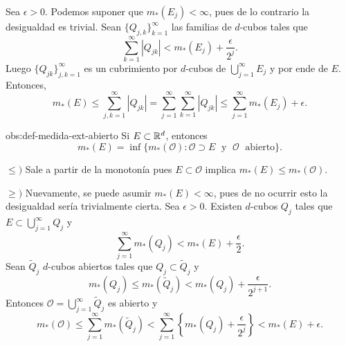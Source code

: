     \begin{demo}   Sea $\epsilon>0$.  Podemos suponer que $m_{*}(E_j)<\infty$, pues de lo contrario la desigualdad es trivial.
   Sean  $\{Q_{j,k}\}_{k=1}^{\infty}$ las familias de $d$-cubos tales que 
    \[
    \sum\limits_{k=1}^{\infty} |Q_{jk}|<m_{*}(E_j)+\frac{\epsilon}{2^j}.
    \]
    Luego $\{Q_{jk}\}_{j, k=1}^{\infty}$ es un cubrimiento por $d$-cubos de $\bigcup\limits_{j=1}^{\infty} E_j$
    y por ende de $E$. 
    Entonces,     
    \[
    m_{*}(E)\leq \sum\limits_{j,k=1}^{\infty} |Q_{jk}|=
    \sum\limits_{j=1}^{\infty} \sum\limits_{k=1}^{\infty} |Q_{jk}|
    \leq \sum\limits_{j=1}^{\infty} m_{*}(E_j)+\epsilon.
    \]


    \end{demo}
    



    \begin{proposicion}{obs:def-medida-ext-abierto}
    Si $E\subset \mathbb{R}^d$, entonces
    \[
    m_{*}(E)=
    \inf\{
    m_{*}(\mathcal{O}): \mathcal{O}\supset E\;\mbox{ y }\;\mathcal{O}\;\mbox{ abierto} 
    \}.
    \]
    \end{proposicion}
    \begin{demo}
    $\leq)$
    Sale a partir de la monoton\'ia pues $E \subset \mathscr{O}$ implica $m_{*}(E)\leq m_{*}(\mathscr{O})$.
    
    \noindent $\geq)$ Nuevamente, se puede asumir $m_*(E)<\infty$, pues de no ocurrir esto la desigualdad sería trivialmente cierta.
    Sea $\epsilon>0$. Existen $d$-cubos  $Q_j$  tales que $E\subset \bigcup\limits_{j=1}^{\infty}Q_j$ y
    \[
    \sum\limits_{j=1}^{\infty} m_{*}(Q_j)< m_{*}(E)+\frac{\epsilon}{2}.
    \]
    Sean $\widetilde{Q}_j$  $d$-cubos abiertos tales que $Q_j \subset \widetilde{Q}_j$ y 
    \[
    m_{*}(Q_j)\leq m_{*}(\widetilde{Q}_j)<m_{*}(Q_j)+\frac{\epsilon}{ 2^{j+1}}.
    \]
    Entonces 
    $\mathcal{O}=\bigcup\limits_{j=1}^{\infty} \widetilde{Q}_j$         es abierto y 
        \[
        m_{*}(\mathscr{O})
        \leq \sum\limits_{j=1}^{\infty}m_{*}(\widetilde{Q}_j)
      <  \sum\limits_{j=1}^{\infty} \left\{m_{*}(Q_j)+\frac{\epsilon}{2^j}\right\}
       <m_{*}(E)+\epsilon.
         \]
    \end{demo}
    
